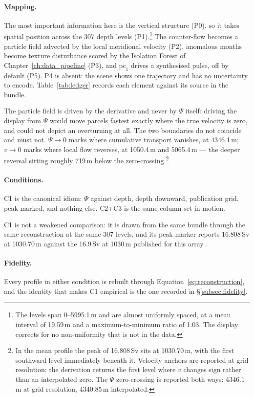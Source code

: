 \paragraph{Mapping.} The most important information here is the vertical structure (P0), so it takes spatial position across the 307 depth levels (P1).\footnote{The levels span 0--5995.1\,m and are almost uniformly spaced, at a mean interval of 19.59\,m and a maximum-to-minimum ratio of 1.03. The display corrects for no non-uniformity that is not in the data.} The counter-flow becomes a particle field advected by the local meridional velocity (P2), anomalous months become texture disturbance scored by the Isolation Forest of Chapter~\ref{ch:data_pipeline} (P3), and $\mathrm{pc}_1$ drives a synthesised pulse, off by default (P5). P4 is absent: the scene shows one trajectory and has no uncertainty to encode. Table~\ref{tab:ledger} records each element against its source in the bundle.

The particle field is driven by the derivative and never by $\Psi$ itself: driving the display from $\Psi$ would move parcels fastest exactly where the true velocity is zero, and could not depict an overturning at all. The two boundaries do not coincide and must not. $\Psi \to 0$ marks where cumulative transport vanishes, at 4346.1\,m; $v \to 0$ marks where local flow reverses, at 1050.4\,m and 5065.4\,m --- the deeper reversal sitting roughly 719\,m below the zero-crossing.\footnote{In the mean profile the peak of 16.808\,Sv sits at 1030.70\,m, with the first southward level immediately beneath it. Velocity anchors are reported at grid resolution: the derivation returns the first level where $v$ changes sign rather than an interpolated zero. The $\Psi$ zero-crossing is reported both ways: 4346.1\,m at grid resolution, 4340.85\,m interpolated.}

\paragraph{Conditions.} C1 is the canonical idiom: $\Psi$ against depth, depth downward, publication grid, peak marked, and nothing else. C2+C3 is the same column set in motion.

C1 is not a weakened comparison: it is drawn from the same bundle through the same reconstruction at the same 307 levels, and its peak marker reports 16.808\,Sv at 1030.70\,m against the 16.9\,Sv at 1030\,m published for this array \parencite{smeed2018}.

\paragraph{Fidelity.} Every profile in either condition is rebuilt through Equation~\ref{eq:reconstruction}, and the identity that makes C1 empirical is the one recorded in \S\ref{subsec:fidelity}.

